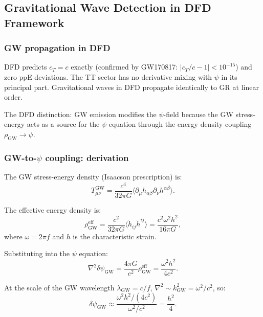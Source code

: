 \documentclass[11pt]{article}
\theoremstyle{definition}
\theoremstyle{remark}
\begin{document}
\subsection{Gravitational Wave Detection in DFD Framework}

\subsubsection{GW propagation in DFD}

DFD predicts $c_T = c$ exactly (confirmed by GW170817: $|c_T/c - 1| < 10^{-15}$)
and zero ppE deviations. The TT sector has no derivative mixing with $\psi$
in its principal part. Gravitational waves in DFD propagate identically
to GR at linear order.

The DFD distinction: GW emission modifies the $\psi$-field because the
GW stress-energy acts as a source for the $\psi$ equation through the
energy density coupling $\rho_{\mathrm{GW}} \to \psi$.

\subsubsection{GW-to-$\psi$ coupling: derivation}

The GW stress-energy density (Isaacson prescription) is:
\begin{equation}
T_{\mu\nu}^{\mathrm{GW}} = \frac{c^4}{32\pi G}
\langle \partial_\mu h_{\alpha\beta} \partial_\nu h^{\alpha\beta}\rangle.
\end{equation}

The effective energy density is:
\begin{equation}
\rho_{\mathrm{GW}}^{\mathrm{eff}}
= \frac{c^2}{32\pi G} \langle \dot{h}_{ij}\dot{h}^{ij}\rangle
= \frac{c^2 \omega^2 h^2}{16\pi G},
\end{equation}
where $\omega = 2\pi f$ and $h$ is the characteristic strain.

Substituting into the $\psi$ equation:
\begin{equation}
\nabla^2\delta\psi_{\mathrm{GW}} = \frac{4\pi G}{c^2}\rho_{\mathrm{GW}}^{\mathrm{eff}}
= \frac{\omega^2 h^2}{4c^2}.
\end{equation}

At the scale of the GW wavelength $\lambda_{\mathrm{GW}} = c/f$,
$\nabla^2 \sim k_{\mathrm{GW}}^2 = \omega^2/c^2$, so:
\begin{equation}
\delta\psi_{\mathrm{GW}} \approx \frac{\omega^2 h^2/(4c^2)}{\omega^2/c^2}
= \frac{h^2}{4}.
\end{equation}
\end{document}
